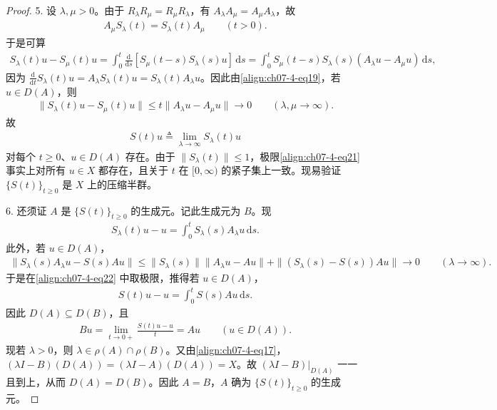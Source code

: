 \documentclass[../../main.tex]{subfiles}
\begin{document}
\begin{proof}
5. 设 $\lambda,\mu>0$。由于 $R_\lambda R_\mu=R_\mu R_\lambda$，有 $A_\lambda A_\mu=A_\mu A_\lambda$，故
\begin{align*}
A_\mu S_\lambda(t)=S_\lambda(t)A_\mu\qquad (t>0).
\end{align*}
于是可算
\begin{align*}
S_\lambda(t)u-S_\mu(t)u=\int_0^t\frac{\mathrm{d}}{\mathrm{d}s}[S_\mu(t-s)S_\lambda(s)u]\,\mathrm{d}s
=\int_0^t S_\mu(t-s)S_\lambda(s)(A_\lambda u-A_\mu u)\,\mathrm{d}s,
\end{align*}
因为 $\frac{\mathrm{d}}{\mathrm{d}t}S_\lambda(t)u=A_\lambda S_\lambda(t)u=S_\lambda(t)A_\lambda u$。因此由\eqref{align:ch07-4-eq19}，若 $u\in D(A)$，则
\begin{align*}
\|S_\lambda(t)u-S_\mu(t)u\|\leqslant t\|A_\lambda u-A_\mu u\|\to 0\qquad (\lambda,\mu\to\infty).
\end{align*}
故
\begin{align}
S(t)u\triangleq \lim_{\lambda\to\infty}S_\lambda(t)u\label{align:ch07-4-eq21}
\end{align}
对每个 $t\geqslant 0$、$u\in D(A)$ 存在。由于 $\|S_\lambda(t)\|\leqslant 1$，极限\eqref{align:ch07-4-eq21} 事实上对所有 $u\in X$ 都存在，且关于 $t$ 在 $[0,\infty)$ 的紧子集上一致。现易验证 $\{S(t)\}_{t\geqslant 0}$ 是 $X$ 上的压缩半群。

6. 还须证 $A$ 是 $\{S(t)\}_{t\geqslant 0}$ 的生成元。记此生成元为 $B$。现
\begin{align}
S_\lambda(t)u-u=\int_0^t S_\lambda(s)A_\lambda u\,\mathrm{d}s.\label{align:ch07-4-eq22}
\end{align}
此外，若 $u\in D(A)$，
\begin{align*}
\|S_\lambda(s)A_\lambda u-S(s)Au\|\leqslant \|S_\lambda(s)\|\|A_\lambda u-Au\|+\|(S_\lambda(s)-S(s))Au\|\to 0\qquad (\lambda\to\infty).
\end{align*}
于是在\eqref{align:ch07-4-eq22} 中取极限，推得若 $u\in D(A)$，
\begin{align*}
S(t)u-u=\int_0^t S(s)Au\,\mathrm{d}s.
\end{align*}
因此 $D(A)\subseteq D(B)$，且
\begin{align*}
Bu=\lim_{t\to 0+}\frac{S(t)u-u}{t}=Au\qquad (u\in D(A)).
\end{align*}
现若 $\lambda>0$，则 $\lambda\in\rho(A)\cap\rho(B)$。又由\eqref{align:ch07-4-eq17}，$(\lambda I-B)(D(A))=(\lambda I-A)(D(A))=X$。故 $(\lambda I-B)|_{D(A)}$ 一一且到上，从而 $D(A)=D(B)$。因此 $A=B$，$A$ 确为 $\{S(t)\}_{t\geqslant 0}$ 的生成元。
\end{proof}
\end{document}
